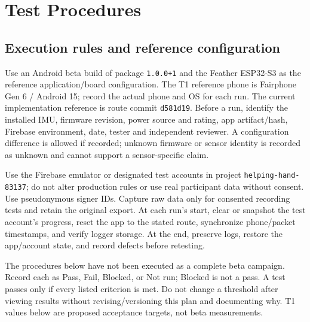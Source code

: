 \documentclass[10pt,letterpaper]{article}
\begin{document}
\section{Test Procedures}
\subsection{Execution rules and reference configuration}
Use an Android beta build of package \texttt{1.0.0+1} and the Feather ESP32-S3 as the reference application/board configuration. The T1 reference phone is Fairphone Gen 6 / Android 15; record the actual phone and OS for each run. The current implementation reference is route commit \texttt{d581d19}. Before a run, identify the installed IMU, firmware revision, power source and rating, app artifact/hash, Firebase environment, date, tester and independent reviewer. A configuration difference is allowed if recorded; unknown firmware or sensor identity is recorded as unknown and cannot support a sensor-specific claim.

Use the Firebase emulator or designated test accounts in project \texttt{helping-hand-83137}; do not alter production rules or use real participant data without consent. Use pseudonymous signer IDs. Capture raw data only for consented recording tests and retain the original export. At each run's start, clear or snapshot the test account's progress, reset the app to the stated route, synchronize phone/packet timestamps, and verify logger storage. At the end, preserve logs, restore the app/account state, and record defects before retesting.

The procedures below have not been executed as a complete beta campaign. Record each as Pass, Fail, Blocked, or Not run; Blocked is not a pass. A test passes only if every listed criterion is met. Do not change a threshold after viewing results without revising/versioning this plan and documenting why. T1 values below are proposed acceptance targets, not beta measurements.
\end{document}
